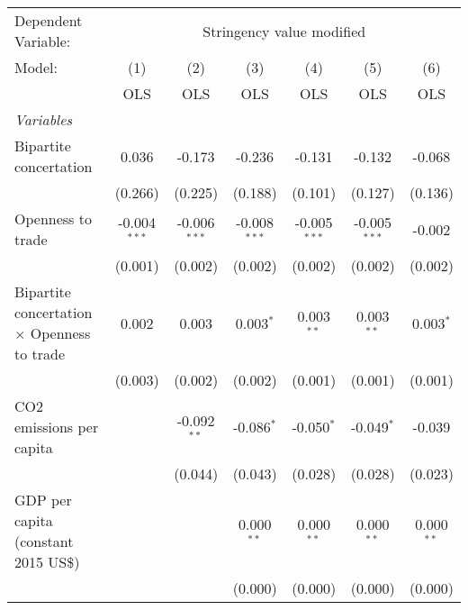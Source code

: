
\begingroup
\centering
\begin{tabular}{lcccccc}
   \toprule
   Dependent Variable: & \multicolumn{6}{c}{Stringency value modified}\\
   Model:                                             & (1)            & (2)            & (3)            & (4)            & (5)            & (6)\\  
                                                      &  OLS           & OLS            & OLS            & OLS            & OLS            & OLS\\  
   \midrule
   \emph{Variables}\\
   Bipartite concertation                             & 0.036          & -0.173         & -0.236         & -0.131         & -0.132         & -0.068\\   
                                                      & (0.266)        & (0.225)        & (0.188)        & (0.101)        & (0.127)        & (0.136)\\   
   Openness to trade                                  & -0.004$^{***}$ & -0.006$^{***}$ & -0.008$^{***}$ & -0.005$^{***}$ & -0.005$^{***}$ & -0.002\\   
                                                      & (0.001)        & (0.002)        & (0.002)        & (0.002)        & (0.002)        & (0.002)\\   
   Bipartite concertation $\times$ Openness to trade  & 0.002          & 0.003          & 0.003$^{*}$    & 0.003$^{**}$   & 0.003$^{**}$   & 0.003$^{*}$\\   
                                                      & (0.003)        & (0.002)        & (0.002)        & (0.001)        & (0.001)        & (0.001)\\   
   CO2 emissions per capita                           &                & -0.092$^{**}$  & -0.086$^{*}$   & -0.050$^{*}$   & -0.049$^{*}$   & -0.039\\   
                                                      &                & (0.044)        & (0.043)        & (0.028)        & (0.028)        & (0.023)\\   
   GDP per capita (constant 2015 US\$)                &                &                & 0.000$^{**}$   & 0.000$^{**}$   & 0.000$^{**}$   & 0.000$^{**}$\\   
                                                      &                &                & (0.000)        & (0.000)        & (0.000)        & (0.000)\\   

\end{tabular}
